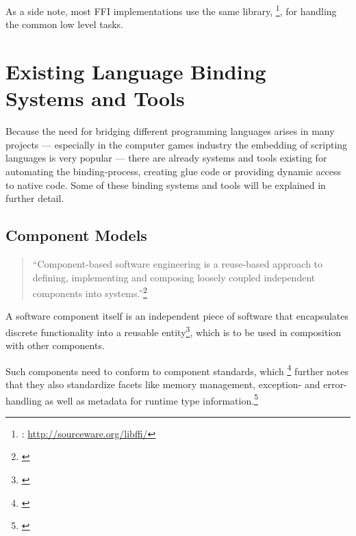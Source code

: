 As a side note, most FFI implementations use the same library, \footnote{: \url{http://sourceware.org/libffi/}}, for handling the common low level tasks.


\section{Existing Language Binding Systems and Tools}

Because the need for bridging different programming languages arises in many \linebreak projects --- especially in the computer games industry the embedding of scripting languages is very popular --- there are already systems and tools existing for automating the binding-process, creating glue code or providing dynamic access to native code. Some of these binding systems and tools will be explained in further detail.

\subsection{Component Models}
\label{sec:ComponentModels}

\begin{quotation}
``Component-based software engineering is a reuse-based approach to defining, implementing and composing loosely coupled independent components into systems.''\footnote{\citep[460]{Sommerville}}
\end{quotation}

A software component itself is an independent piece of software that encapsulates discrete functionality into a reusable entity\footnote{\citep[3]{ComponentTechnology}}, which is to be used in composition with other components.

Such components need to conform to component standards, which \footnote{\citep[440]{Sommerville}}  further notes that they also standardize facets like memory management, exception- and error-handling as well as metadata for runtime type information.\footnote{\citep[8]{ComponentTechnology}}

